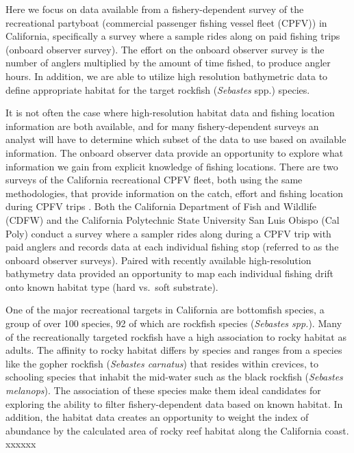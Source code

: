 \documentclass[
  12pt,
  authoryear,
  preprint,
  3p]{elsarticle}
\begin{document}
Here we focus on data available from a fishery-dependent survey of the
recreational partyboat (commercial passenger fishing vessel fleet
(CPFV)) in California, specifically a survey where a sample rides along
on paid fishing trips (onboard observer survey). The effort on the
onboard observer survey is the number of anglers multiplied by the
amount of time fished, to produce angler hours. In addition, we are able
to utilize high resolution bathymetric data to define appropriate
habitat for the target rockfish (\emph{Sebastes} spp.) species.

It is not often the case where high-resolution habitat data and fishing
location information are both available, and for many fishery-dependent
surveys an analyst will have to determine which subset of the data to
use based on available information. The onboard observer data provide an
opportunity to explore what information we gain from explicit knowledge
of fishing locations. There are two surveys of the California
recreational CPFV fleet, both using the same methodologies, that provide
information on the catch, effort and fishing location during CPFV trips
\citep{Monk:2014:DRD}. Both the California Department of Fish and
Wildlife (CDFW) and the California Polytechnic State University San Luis
Obispo (Cal Poly) conduct a survey where a sampler rides along during a
CPFV trip with paid anglers and records data at each individual fishing
stop (referred to as the onboard observer surveys). Paired with recently
available high-resolution bathymetry data provided an opportunity to map
each individual fishing drift onto known habitat type (hard vs.~soft
substrate).

One of the major recreational targets in California are bottomfish
species, a group of over 100 species, 92 of which are rockfish species
(\emph{Sebastes spp.}). Many of the recreationally targeted rockfish
have a high association to rocky habitat as adults. The affinity to
rocky habitat differs by species and ranges from a species like the
gopher rockfish (\emph{Sebastes carnatus}) that resides within crevices,
to schooling species that inhabit the mid-water such as the black
rockfish (\emph{Sebastes melanops}). The association of these species
make them ideal candidates for exploring the ability to filter
fishery-dependent data based on known habitat. In addition, the habitat
data creates an opportunity to weight the index of abundance by the
calculated area of rocky reef habitat along the California coast. xxxxxx
\end{document}
